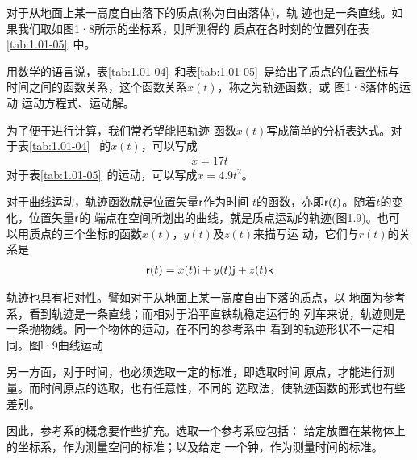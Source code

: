     对于从地面上某一高度自由落下的质点(称为自由落体)，轨
迹也是一条直线。如果我们取如图1·8所示的坐标系，则所测得的
质点在各时刻的位置列在表\ref{tab:1.01-05}~中。
\begin{table}[!h]
    \vspace{-0.5em}
    \caption{}
    \label{tab:1.01-05}
    \centering
    \vspace{-1.2em}
\end{table}

    用数学的语言说，表\ref{tab:1.01-04}~和表\ref{tab:1.01-05}~是给出了质点的位置坐标与
时间之间的函数关系，这个函数关系$x(t)$，称之为轨迹函数，或
图1·8落体的运动
运动方程式、运动解。

    为了便于进行计算，我们常希望能把轨迹
函数$x(t)$写成简单的分析表达式。对于表\ref{tab:1.01-04}~
的$x(t)$，可以写成
\begin{align}
    x=17t \label{equ:1.01.05-01}
\end{align}
对于表\ref{tab:1.01-05}~的运动，可以写成$x=4.9t^2$。

    对于曲线运动，轨迹函数就是位置矢量${\sf r}$作为时间
$t$的函数，亦即${\sf r}(t)$。随着$t$的变化，位置矢量${\sf r}$的
端点在空间所划出的曲线，就是质点运动的轨迹(图1.9)。也可
以用质点的三个坐标的函数$x(t)$，$y(t)$及$z(t)$来描写运
动，它们与$r(t)$的关系是
\begin{align}
    {\sf r}(t)=x(t){\sf i}+y(t){\sf j}+z(t){\sf k}
\end{align}

    轨迹也具有相对性。譬如对于从地面上某一高度自由下落的质点，以
地面为参考系，看到轨迹是一条直线；而相对于沿平直铁轨稳定运行的
列车来说，轨迹则是一条抛物线。同一个物体的运动，在不同的参考系中
看到的轨迹形状不一定相同。图l·9曲线运动

    另一方面，对于时间，也必须选取一定的标准，即选取时间
原点，才能进行测量。而时间原点的选取，也有任意性，不同的
选取法，使轨迹函数的形式也有些差别。

    因此，参考系的概念要作些扩充。选取一个参考系应包括：
给定放置在某物体上的坐标系，作为测量空间的标准；以及给定
一个钟，作为测量时间的标准。